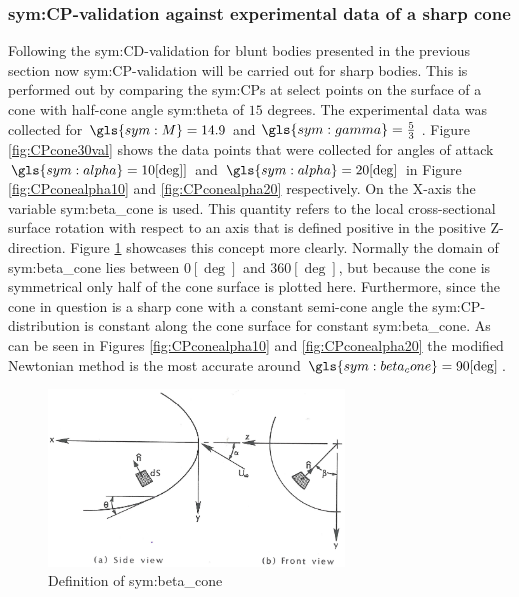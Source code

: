 \subsubsection{\gls{sym:CP}-validation against experimental data of a sharp cone}
\label{subsubsec:valsharpconeCP}
Following the \gls{sym:CD}-validation for blunt bodies presented in the previous section now \gls{sym:CP}-validation will be carried out for sharp bodies. This is performed out by comparing the \glspl{sym:CP} at select points on the surface of a cone with half-cone angle \gls{sym:theta} of $15$ degrees. The experimental data was collected for $\gls{sym:M}=14.9$ and $\gls{sym:gamma}=\frac{5}{3}$  \cite{Bertin1994,Cleary1970}. Figure \ref{fig:CPcone30val} shows the data points that were collected for angles of attack $\gls{sym:alpha}=10[\deg]]$ and $\gls{sym:alpha}=20[\deg]$ in Figure \ref{fig:CPconealpha10} and \ref{fig:CPconealpha20} respectively. On the X-axis the variable \gls{sym:beta_cone} is used. This quantity refers to the local cross-sectional surface rotation with respect to an axis that is defined positive in the positive Z-direction. Figure \ref{fig:beta_cone} showcases this concept more clearly. Normally the domain of \gls{sym:beta_cone} lies between $0[\deg]$ and $360[\deg]$, but because the cone is symmetrical only half of the cone surface is plotted here. Furthermore, since the cone in question is a sharp cone with a constant semi-cone angle the \gls{sym:CP}-distribution is constant along the cone surface for constant \gls{sym:beta_cone}.
As can be seen in Figures \ref{fig:CPconealpha10} and \ref{fig:CPconealpha20} the modified Newtonian method is the most accurate around $\gls{sym:beta_cone}=90[\deg]$.

\begin{figure}[h]
	\centering
	\includegraphics[width=0.7\textwidth]{./Figure/def_beta}
	\caption{Definition of \gls{sym:beta_cone} \cite{Bertin1994}}
	\label{fig:beta_cone}
\end{figure}

